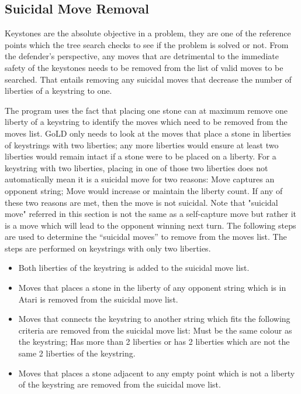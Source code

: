 \documentclass{l4proj}
\begin{document}
\subsection{Suicidal Move Removal}
Keystones are the absolute objective in a problem, they are one of the reference points which the tree search checks to see if the problem is solved or not. From the defender’s perspective, any moves that are detrimental to the immediate safety of the keystones needs to be removed from the list of valid moves to be searched. That entails removing any suicidal moves that decrease the number of liberties of a keystring to one.

The program uses the fact that placing one stone can at maximum remove one liberty of a keystring to identify the moves which need to be removed from the moves list. GoLD only needs to look at the moves that place a stone in liberties of keystrings with two liberties; any more liberties would ensure at least two liberties would remain intact if a stone were to be placed on a liberty. For a keystring with two liberties, placing in one of those two liberties does not automatically mean it is a suicidal move for two reasons: Move captures an opponent string; Move would increase or maintain the liberty count. If any of these two reasons are met, then the move is not suicidal. Note that "suicidal move" referred in this section is not the same as a self-capture move but rather it is a move which will lead to the opponent winning next turn.
The following steps are used to determine the “suicidal moves” to remove from the moves list. The steps are performed on keystrings with only two liberties.
\begin{itemize}
    \item Both liberties of the keystring is added to the suicidal move list.
    \item Moves that places a stone in the liberty of any opponent string which is in Atari is removed from the suicidal move list.
    \item Moves that connects the keystring to another string which fits the following criteria are removed from the suicidal move list: Must be the same colour as the keystring; Has more than 2 liberties or has 2 liberties which are not the same 2 liberties of the keystring.
    \item Moves that places a stone adjacent to any empty point which is not a liberty of the keystring are removed from the suicidal move list.
\end{itemize}
\end{document}
